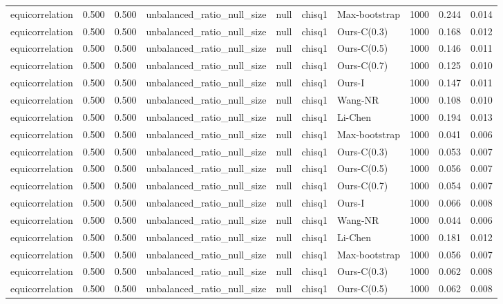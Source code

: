 \begin{tabular}{lrrllllrrr}
equicorrelation & 0.500 & 0.500 & unbalanced\_ratio\_null\_size & null & chisq1 & Max-bootstrap & 1000 & 0.244 & 0.014 \\
equicorrelation & 0.500 & 0.500 & unbalanced\_ratio\_null\_size & null & chisq1 & Ours-C(0.3) & 1000 & 0.168 & 0.012 \\
equicorrelation & 0.500 & 0.500 & unbalanced\_ratio\_null\_size & null & chisq1 & Ours-C(0.5) & 1000 & 0.146 & 0.011 \\
equicorrelation & 0.500 & 0.500 & unbalanced\_ratio\_null\_size & null & chisq1 & Ours-C(0.7) & 1000 & 0.125 & 0.010 \\
equicorrelation & 0.500 & 0.500 & unbalanced\_ratio\_null\_size & null & chisq1 & Ours-I & 1000 & 0.147 & 0.011 \\
equicorrelation & 0.500 & 0.500 & unbalanced\_ratio\_null\_size & null & chisq1 & Wang-NR & 1000 & 0.108 & 0.010 \\
equicorrelation & 0.500 & 0.500 & unbalanced\_ratio\_null\_size & null & chisq1 & Li-Chen & 1000 & 0.194 & 0.013 \\
equicorrelation & 0.500 & 0.500 & unbalanced\_ratio\_null\_size & null & chisq1 & Max-bootstrap & 1000 & 0.041 & 0.006 \\
equicorrelation & 0.500 & 0.500 & unbalanced\_ratio\_null\_size & null & chisq1 & Ours-C(0.3) & 1000 & 0.053 & 0.007 \\
equicorrelation & 0.500 & 0.500 & unbalanced\_ratio\_null\_size & null & chisq1 & Ours-C(0.5) & 1000 & 0.056 & 0.007 \\
equicorrelation & 0.500 & 0.500 & unbalanced\_ratio\_null\_size & null & chisq1 & Ours-C(0.7) & 1000 & 0.054 & 0.007 \\
equicorrelation & 0.500 & 0.500 & unbalanced\_ratio\_null\_size & null & chisq1 & Ours-I & 1000 & 0.066 & 0.008 \\
equicorrelation & 0.500 & 0.500 & unbalanced\_ratio\_null\_size & null & chisq1 & Wang-NR & 1000 & 0.044 & 0.006 \\
equicorrelation & 0.500 & 0.500 & unbalanced\_ratio\_null\_size & null & chisq1 & Li-Chen & 1000 & 0.181 & 0.012 \\
equicorrelation & 0.500 & 0.500 & unbalanced\_ratio\_null\_size & null & chisq1 & Max-bootstrap & 1000 & 0.056 & 0.007 \\
equicorrelation & 0.500 & 0.500 & unbalanced\_ratio\_null\_size & null & chisq1 & Ours-C(0.3) & 1000 & 0.062 & 0.008 \\
equicorrelation & 0.500 & 0.500 & unbalanced\_ratio\_null\_size & null & chisq1 & Ours-C(0.5) & 1000 & 0.062 & 0.008 \\

\end{tabular}
